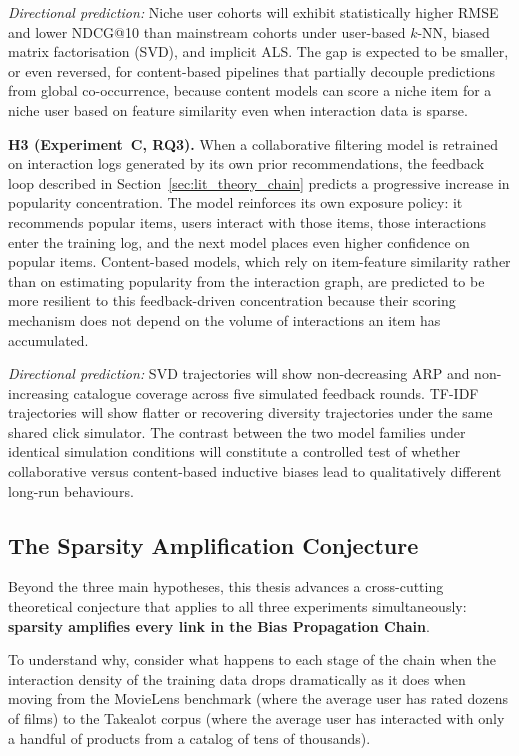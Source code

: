 \documentclass[11pt,a4paper]{report}
\begin{document}
\emph{Directional prediction:} Niche user cohorts will exhibit statistically higher RMSE and lower NDCG@10 than mainstream cohorts under user-based $k$-NN, biased matrix factorisation (SVD), and implicit ALS. The gap is expected to be smaller, or even reversed, for content-based pipelines that partially decouple predictions from global co-occurrence, because content models can score a niche item for a niche user based on feature similarity even when interaction data is sparse.

\textbf{H3 (Experiment~C, RQ3).}
When a collaborative filtering model is retrained on interaction logs generated by its own prior recommendations, the feedback loop described in Section~\ref{sec:lit_theory_chain} predicts a progressive increase in popularity concentration. The model reinforces its own exposure policy: it recommends popular items, users interact with those items, those interactions enter the training log, and the next model places even higher confidence on popular items. Content-based models, which rely on item-feature similarity rather than on estimating popularity from the interaction graph, are predicted to be more resilient to this feedback-driven concentration because their scoring mechanism does not depend on the volume of interactions an item has accumulated.

\emph{Directional prediction:} SVD trajectories will show non-decreasing ARP and non-increasing catalogue coverage across five simulated feedback rounds. TF-IDF trajectories will show flatter or recovering diversity trajectories under the same shared click simulator. The contrast between the two model families under identical simulation conditions will constitute a controlled test of whether collaborative versus content-based inductive biases lead to qualitatively different long-run behaviours.

\subsection{The Sparsity Amplification Conjecture}
\label{sec:lit_theory_sparsity}

Beyond the three main hypotheses, this thesis advances a cross-cutting theoretical conjecture that applies to all three experiments simultaneously: \textbf{sparsity amplifies every link in the Bias Propagation Chain}.

To understand why, consider what happens to each stage of the chain when the interaction density of the training data drops dramatically as it does when moving from the MovieLens benchmark (where the average user has rated dozens of films) to the Takealot corpus (where the average user has interacted with only a handful of products from a catalog of tens of thousands).
\end{document}
